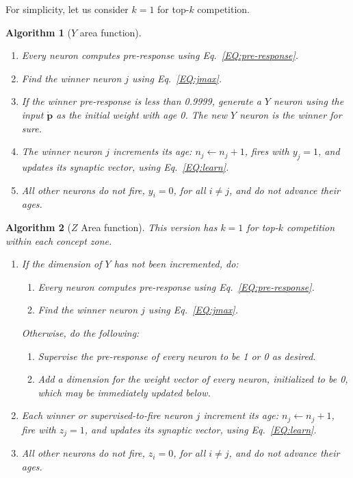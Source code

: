 \documentclass[conference]{IEEEtran}
\def\p{\mathbf p}
\newtheorem{algorithm}{Algorithm}
\begin{document}
For simplicity, let us consider $k=1$ for top-$k$ competition.   
\begin{algorithm}[$Y$ area function]  
\begin{enumerate}
\item Every neuron computes pre-response using Eq.~\eqref{EQ:pre-response}.  
\item Find the winner neuron $j$ using Eq.~\eqref{EQ:jmax}.  
\item If the winner pre-response is less than 0.9999, generate a $Y$ neuron using the input $\dot{\p}$ as the initial weight with age 0.  
The new $Y$ neuron is the winner for sure. 
\item The winner neuron $j$ increments its age: $n_j \leftarrow n_j+1$, fires with $y_j=1$, and  updates its synaptic vector, using Eq.~\eqref{EQ:learn}.
\item All other neurons do not fire, 
$y_i=0$, for all $i\neq j$, and do not advance their ages. 
\end{enumerate}
\end{algorithm}

\begin{algorithm}[$Z$ Area function]  This version has $k=1$ for top-$k$ competition within each
concept zone.   
\begin{enumerate}
\item If the dimension of $Y$ has not been incremented, do: 
\begin{enumerate}
\item Every neuron computes pre-response using Eq.~\eqref{EQ:pre-response}.
\item Find the winner neuron $j$ using Eq.~\eqref{EQ:jmax}.
\end{enumerate}
Otherwise, do the following:
\begin{enumerate}
\item Supervise the pre-response of every neuron to be 1 or 0 as desired. 
\item Add a dimension for the weight vector of every neuron, initialized to be 0, which may be immediately updated below.
\end{enumerate}
\item Each winner or supervised-to-fire neuron $j$ increment its age: $n_j \leftarrow n_j+1$, fire with $z_j=1$, and  updates its synaptic vector, using Eq.~\eqref{EQ:learn}.
\item All other neurons do not fire, 
$z_i=0$, for all $i\neq j$, and do not advance their ages. 
\end{enumerate}
\end{algorithm}
\end{document}
